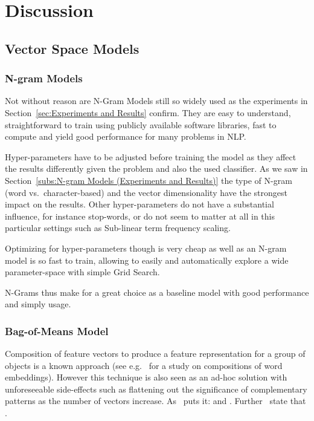
\clearpage

\section{Discussion}
\label{sec:Discussion}


\subsection{Vector Space Models}
\label{sub:Vector Space Models (Discussion)}

\subsubsection{N-gram Models}

Not without reason are N-Gram Models still so widely used as the experiments in Section~\ref{sec:Experiments and Results} confirm. They are easy to understand, straightforward to train using publicly available software libraries, fast to compute and yield good performance for many problems in \gls{NLP}.

Hyper-parameters have to be adjusted before training the model as they affect the results differently given the problem and also the used classifier. As we saw in Section~\ref{subs:N-gram Models (Experiments and Results)} the type of N-gram (word vs.\ character-based) and the vector dimensionality have the strongest impact on the results. Other hyper-parameters do not have a substantial influence, for instance stop-words, or do not seem to matter at all in this particular settings such as Sub-linear term frequency scaling.

Optimizing for hyper-parameters though is very cheap as well as an N-gram model is so fast to train, allowing to easily and automatically explore a wide parameter-space with simple \gls{Grid Search}.

N-Grams thus make for a great choice as a baseline model with good performance and simply usage.

\subsubsection{Bag-of-Means Model}

Composition of feature vectors to produce a feature representation for a group of objects is a known approach (see e.g.~\cite{Mitchell:2010aa} for a study on compositions of word embeddings). However this technique is also seen as an ad-hoc solution with unforeseeable side-effects such as flattening out the significance of complementary patterns as the number of vectors increase. As~\cite{Zhang:2015aa} puts it:  and . Further~\cite{Le:2014aa} state that .

